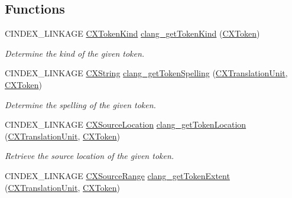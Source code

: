 \subsection*{Functions}
\begin{DoxyCompactItemize}
\item 
\mbox{\label{group__CINDEX__LEX_ga83f692a67fe4dbeea779f37c0a3b7f20}} 
C\+I\+N\+D\+E\+X\+\_\+\+L\+I\+N\+K\+A\+GE \hyperlink{group__CINDEX__LEX_gaf63e37eee4280e2c039829af24bbc201}{C\+X\+Token\+Kind} \hyperlink{group__CINDEX__LEX_ga83f692a67fe4dbeea779f37c0a3b7f20}{clang\+\_\+get\+Token\+Kind} (\hyperlink{structCXToken}{C\+X\+Token})
\begin{DoxyCompactList}\small\item\em Determine the kind of the given token. \end{DoxyCompactList}\item 
C\+I\+N\+D\+E\+X\+\_\+\+L\+I\+N\+K\+A\+GE \hyperlink{structCXString}{C\+X\+String} \hyperlink{group__CINDEX__LEX_ga1033a25c9d2c59bcbdb23020de0bba2c}{clang\+\_\+get\+Token\+Spelling} (\hyperlink{group__CINDEX_gacdb7815736ca709ce9a5e1ec2b7e16ac}{C\+X\+Translation\+Unit}, \hyperlink{structCXToken}{C\+X\+Token})
\begin{DoxyCompactList}\small\item\em Determine the spelling of the given token. \end{DoxyCompactList}\item 
\mbox{\label{group__CINDEX__LEX_ga76a721514acb4cc523e10a6913d88021}} 
C\+I\+N\+D\+E\+X\+\_\+\+L\+I\+N\+K\+A\+GE \hyperlink{structCXSourceLocation}{C\+X\+Source\+Location} \hyperlink{group__CINDEX__LEX_ga76a721514acb4cc523e10a6913d88021}{clang\+\_\+get\+Token\+Location} (\hyperlink{group__CINDEX_gacdb7815736ca709ce9a5e1ec2b7e16ac}{C\+X\+Translation\+Unit}, \hyperlink{structCXToken}{C\+X\+Token})
\begin{DoxyCompactList}\small\item\em Retrieve the source location of the given token. \end{DoxyCompactList}\item 
\mbox{\label{group__CINDEX__LEX_ga5acbc0a2a3c01aa44e1c5c5ccc4e328b}} 
C\+I\+N\+D\+E\+X\+\_\+\+L\+I\+N\+K\+A\+GE \hyperlink{structCXSourceRange}{C\+X\+Source\+Range} \hyperlink{group__CINDEX__LEX_ga5acbc0a2a3c01aa44e1c5c5ccc4e328b}{clang\+\_\+get\+Token\+Extent} (\hyperlink{group__CINDEX_gacdb7815736ca709ce9a5e1ec2b7e16ac}{C\+X\+Translation\+Unit}, \hyperlink{structCXToken}{C\+X\+Token})

\end{DoxyCompactItemize}
